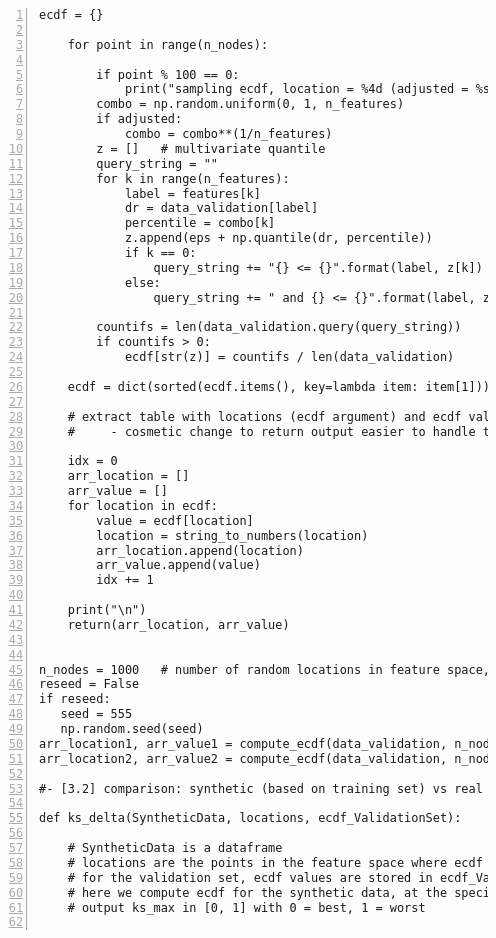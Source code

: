 \documentclass[oneside,10pt]{book}
\begin{document}
\begin{lstlisting}[numbers=left]
    ecdf = {} 

    for point in range(n_nodes):

        if point % 100 == 0:
            print("sampling ecdf, location = %4d (adjusted = %s):" % (point, adjusted))
        combo = np.random.uniform(0, 1, n_features)
        if adjusted:
            combo = combo**(1/n_features)
        z = []   # multivariate quantile
        query_string = ""
        for k in range(n_features):
            label = features[k]
            dr = data_validation[label]
            percentile = combo[k] 
            z.append(eps + np.quantile(dr, percentile))
            if k == 0:
                query_string += "{} <= {}".format(label, z[k])
            else: 
                query_string += " and {} <= {}".format(label, z[k])

        countifs = len(data_validation.query(query_string))
        if countifs > 0: 
            ecdf[str(z)] = countifs / len(data_validation)
  
    ecdf = dict(sorted(ecdf.items(), key=lambda item: item[1]))

    # extract table with locations (ecdf argument) and ecdf values:
    #     - cosmetic change to return output easier to handle than ecdf 

    idx = 0
    arr_location = []
    arr_value = []
    for location in ecdf:
        value = ecdf[location]
        location = string_to_numbers(location)
        arr_location.append(location)
        arr_value.append(value)
        idx += 1

    print("\n")
    return(arr_location, arr_value)


n_nodes = 1000   # number of random locations in feature space, where ecdf is computed
reseed = False
if reseed:
   seed = 555
   np.random.seed(seed) 
arr_location1, arr_value1 = compute_ecdf(data_validation, n_nodes, adjusted = True)
arr_location2, arr_value2 = compute_ecdf(data_validation, n_nodes, adjusted = False)

#- [3.2] comparison: synthetic (based on training set) vs real (validation set)

def ks_delta(SyntheticData, locations, ecdf_ValidationSet):

    # SyntheticData is a dataframe
    # locations are the points in the feature space where ecdf is computed
    # for the validation set, ecdf values are stored in ecdf_ValidationSet
    # here we compute ecdf for the synthetic data, at the specified locations
    # output ks_max in [0, 1] with 0 = best, 1 = worst


\end{lstlisting}
\end{document}
